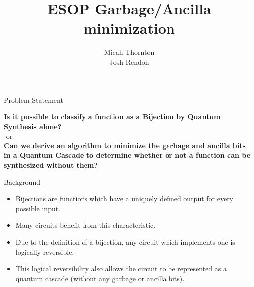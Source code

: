 \documentclass[pdf]{beamer}
\title{ESOP Garbage/Ancilla minimization}
\subtitle{}
\author{Micah Thornton \\ Josh Rendon}
\begin{document}
\begin{frame}
\titlepage
\end{frame}

\begin{frame}{Problem Statement}
    \begin{center}
    \textbf{Is it possible to classify a function as a Bijection by Quantum Synthesis alone?} \\ 
    -or-\\ 
    \textbf{Can we derive an algorithm to minimize the garbage and ancilla bits in a Quantum Cascade to determine whether or not a function can be synthesized without them?}
    \end{center}
\end{frame}

\begin{frame}{Background}
\begin{itemize}
   \item Bijections are functions which have a uniquely defined output for every possible input.
   \item Many circuits benefit from this characteristic. 
   \item Due to the definition of a bijection, any circuit which implements one is logically reversible. 
   \item This logical reversibility also allows the circuit to be represented as a quantum cascade (without any garbage or ancilla bits).
\end{itemize}
\end{frame}
\end{document}
